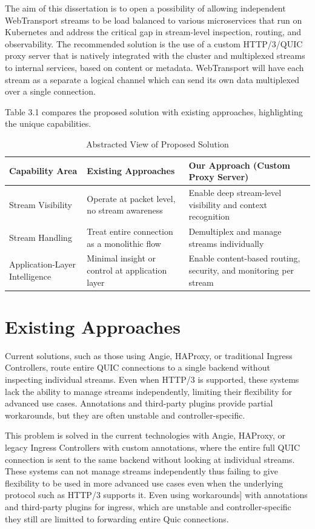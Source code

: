 The aim of this dissertation is to open a possibility of allowing independent WebTransport streams to be load balanced to various microservices that run on Kubernetes and  address the critical gap in stream-level inspection, routing, and observability. The recommended solution is the use of a custom HTTP/3/QUIC proxy server that is natively integrated with the cluster and multiplexed streams to internal services, based on content or metadata. WebTransport will have each stream as a separate a logical channel which can send its own data multiplexed over a single connection.


Table 3.1 compares the proposed solution with existing approaches, highlighting the unique capabilities.

\begin{table}[h]
\centering
\caption{Abstracted View of Proposed Solution}
\begin{tabular}{|p{4cm}|p{5cm}|p{5cm}|}
\hline
\textbf{Capability Area} & \textbf{Existing Approaches} & \textbf{Our Approach (Custom Proxy Server)} \\
\hline
Stream Visibility & Operate at packet level, no stream awareness & Enable deep stream-level visibility and context recognition \\
\hline
Stream Handling & Treat entire connection as a monolithic flow & Demultiplex and manage streams individually \\
\hline
Application-Layer Intelligence & Minimal insight or control at application layer & Enable content-based routing, security, and monitoring per stream \\
\hline
\end{tabular}
\end{table}

\section{Existing Approaches}
Current solutions, such as those using Angie, HAProxy, or traditional Ingress Controllers, route entire QUIC connections to a single backend without inspecting individual streams. Even when HTTP/3 is supported, these systems lack the ability to manage streams independently, limiting their flexibility for advanced use cases. Annotations and third-party plugins provide partial workarounds, but they are often unstable and controller-specific.

This problem is solved in the current technologies with Angie, HAProxy, or legacy Ingress Controllers with custom annotations, where the entire full QUIC connection is sent to the same backend without looking at individual streams. These systems can not manage streams independently thus failing to give flexibility to be used in more advanced use cases even when the underlying protocol such as HTTP/3 supports it. Even using workarounds] with annotations and third-party plugins for ingress, which are unstable and controller-specific they still are limitted to forwarding entire Quic connections.

